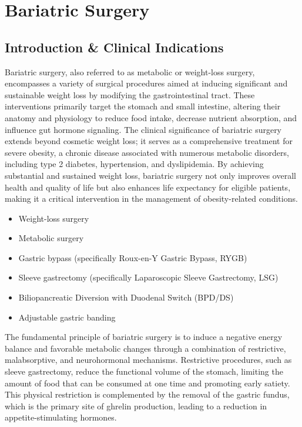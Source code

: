 \chapter{Bariatric Surgery}

\section*{Introduction \& Clinical Indications}
Bariatric surgery, also referred to as metabolic or weight-loss surgery, encompasses a variety of surgical procedures aimed at inducing significant and sustainable weight loss by modifying the gastrointestinal tract. These interventions primarily target the stomach and small intestine, altering their anatomy and physiology to reduce food intake, decrease nutrient absorption, and influence gut hormone signaling. The clinical significance of bariatric surgery extends beyond cosmetic weight loss; it serves as a comprehensive treatment for severe obesity, a chronic disease associated with numerous metabolic disorders, including type 2 diabetes, hypertension, and dyslipidemia. By achieving substantial and sustained weight loss, bariatric surgery not only improves overall health and quality of life but also enhances life expectancy for eligible patients, making it a critical intervention in the management of obesity-related conditions.

\begin{itemize}
  \item Weight-loss surgery
  \item Metabolic surgery
  \item Gastric bypass (specifically Roux-en-Y Gastric Bypass, RYGB)
  \item Sleeve gastrectomy (specifically Laparoscopic Sleeve Gastrectomy, LSG)
  \item Biliopancreatic Diversion with Duodenal Switch (BPD/DS)
  \item Adjustable gastric banding
\end{itemize}

The fundamental principle of bariatric surgery is to induce a negative energy balance and favorable metabolic changes through a combination of restrictive, malabsorptive, and neurohormonal mechanisms. Restrictive procedures, such as sleeve gastrectomy, reduce the functional volume of the stomach, limiting the amount of food that can be consumed at one time and promoting early satiety. This physical restriction is complemented by the removal of the gastric fundus, which is the primary site of ghrelin production, leading to a reduction in appetite-stimulating hormones.

